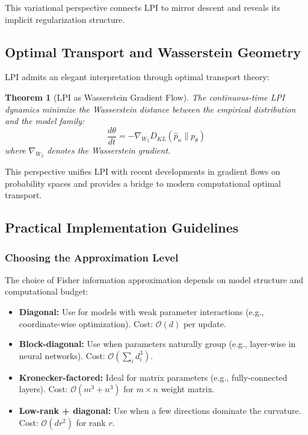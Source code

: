 \documentclass[11pt]{article}
\newtheorem{theorem}{Theorem}
\begin{document}
This variational perspective connects LPI to mirror descent \cite{nemirovski1983problem} and reveals its implicit regularization structure.

\subsection{Optimal Transport and Wasserstein Geometry}

LPI admits an elegant interpretation through optimal transport theory:

\begin{theorem}[LPI as Wasserstein Gradient Flow]
The continuous-time LPI dynamics minimize the Wasserstein distance between the empirical distribution and the model family:
\begin{equation}
\frac{d\theta}{dt} = -\nabla_{W_2} D_{KL}(\hat{p}_n \| p_\theta)
\end{equation}
where $\nabla_{W_2}$ denotes the Wasserstein gradient.
\end{theorem}

This perspective unifies LPI with recent developments in gradient flows on probability spaces \cite{ambrosio2008gradient} and provides a bridge to modern computational optimal transport.

\subsection{Practical Implementation Guidelines}

\subsubsection{Choosing the Approximation Level}

The choice of Fisher information approximation depends on model structure and computational budget:

\begin{itemize}
\item \textbf{Diagonal:} Use for models with weak parameter interactions (e.g., coordinate-wise optimization). Cost: $\mathcal{O}(d)$ per update.
\item \textbf{Block-diagonal:} Use when parameters naturally group (e.g., layer-wise in neural networks). Cost: $\mathcal{O}(\sum_i d_i^3)$.
\item \textbf{Kronecker-factored:} Ideal for matrix parameters (e.g., fully-connected layers). Cost: $\mathcal{O}(m^3 + n^3)$ for $m \times n$ weight matrix.
\item \textbf{Low-rank + diagonal:} Use when a few directions dominate the curvature. Cost: $\mathcal{O}(dr^2)$ for rank $r$.
\end{itemize}
\end{document}
